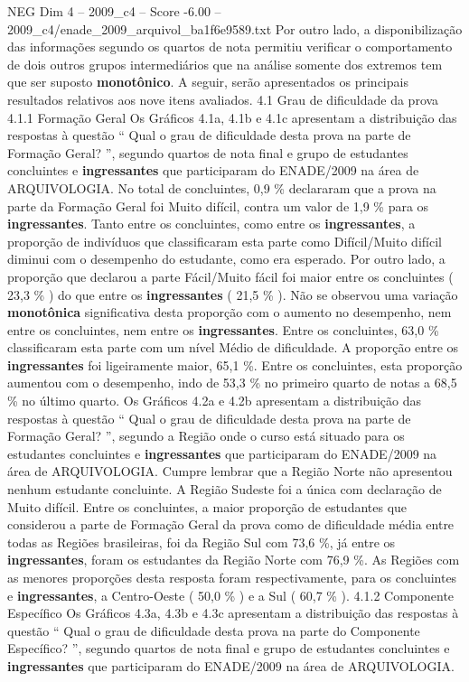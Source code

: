 \begin{textsample}{NEG Dim 4 – 2009\_c4 – Score -6.00 – 2009\_c4/enade\_2009\_arquivol\_ba1f6e9589.txt}
Por outro lado, a disponibilização das informações segundo os quartos de nota permitiu verificar o comportamento de dois outros grupos intermediários que na análise somente dos extremos tem que ser suposto \textbf{monotônico}.
A seguir, serão apresentados os principais resultados relativos aos nove itens avaliados. 4.1 Grau de dificuldade da prova 4.1.1 Formação Geral Os Gráficos 4.1a, 4.1b e 4.1c apresentam a distribuição das respostas à questão “ Qual o grau de dificuldade desta prova na parte de Formação Geral? ”, segundo quartos de nota final e grupo de estudantes concluintes e \textbf{ingressantes} que participaram do ENADE/2009 na área de ARQUIVOLOGIA.
No total de concluintes, 0,9 \% declararam que a prova na parte da Formação Geral foi Muito difícil, contra um valor de 1,9 \% para os \textbf{ingressantes}.
Tanto entre os concluintes, como entre os \textbf{ingressantes}, a proporção de indivíduos que classificaram esta parte como Difícil/Muito difícil diminui com o desempenho do estudante, como era esperado.
Por outro lado, a proporção que declarou a parte Fácil/Muito fácil foi maior entre os concluintes ( 23,3 \% ) do que entre os \textbf{ingressantes} ( 21,5 \% ).
Não se observou uma variação \textbf{monotônica} significativa desta proporção com o aumento no desempenho, nem entre os concluintes, nem entre os \textbf{ingressantes}.
Entre os concluintes, 63,0 \% classificaram esta parte com um nível Médio de dificuldade.
A proporção entre os \textbf{ingressantes} foi ligeiramente maior, 65,1 \%.
Entre os concluintes, esta proporção aumentou com o desempenho, indo de 53,3 \% no primeiro quarto de notas a 68,5 \% no último quarto.
Os Gráficos 4.2a e 4.2b apresentam a distribuição das respostas à questão “ Qual o grau de dificuldade desta prova na parte de Formação Geral? ”, segundo a Região onde o curso está situado para os estudantes concluintes e \textbf{ingressantes} que participaram do ENADE/2009 na área de ARQUIVOLOGIA.
Cumpre lembrar que a Região Norte não apresentou nenhum estudante concluinte.
A Região Sudeste foi a única com declaração de Muito difícil.
Entre os concluintes, a maior proporção de estudantes que considerou a parte de Formação Geral da prova como de dificuldade média entre todas as Regiões brasileiras, foi da Região Sul com 73,6 \%, já entre os \textbf{ingressantes}, foram os estudantes da Região Norte com 76,9 \%.
As Regiões com as menores proporções desta resposta foram respectivamente, para os concluintes e \textbf{ingressantes}, a Centro-Oeste ( 50,0 \% ) e a Sul ( 60,7 \% ). 4.1.2 Componente Específico Os Gráficos 4.3a, 4.3b e 4.3c apresentam a distribuição das respostas à questão “ Qual o grau de dificuldade desta prova na parte do Componente Específico? ”, segundo quartos de nota final e grupo de estudantes concluintes e \textbf{ingressantes} que participaram do ENADE/2009 na área de ARQUIVOLOGIA.

\end{textsample}
